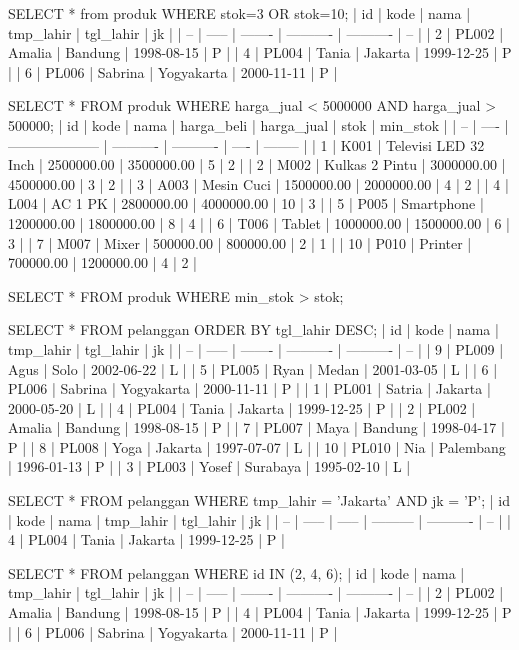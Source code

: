 SELECT * from produk WHERE stok=3 OR stok=10;
| id | kode  | nama    | tmp_lahir  | tgl_lahir  | jk |
| -- | ----- | ------- | ---------- | ---------- | -- |
| 2  | PL002 | Amalia  | Bandung    | 1998-08-15 | P  |
| 4  | PL004 | Tania   | Jakarta    | 1999-12-25 | P  |
| 6  | PL006 | Sabrina | Yogyakarta | 2000-11-11 | P  |

SELECT * FROM produk WHERE harga_jual < 5000000 AND harga_jual > 500000;
| id | kode | nama                 | harga_beli | harga_jual | stok | min_stok |
| -- | ---- | -------------------- | ---------- | ---------- | ---- | -------- |
| 1  | K001 | Televisi LED 32 Inch | 2500000.00 | 3500000.00 | 5    | 2        |
| 2  | M002 | Kulkas 2 Pintu       | 3000000.00 | 4500000.00 | 3    | 2        |
| 3  | A003 | Mesin Cuci           | 1500000.00 | 2000000.00 | 4    | 2        |
| 4  | L004 | AC 1 PK              | 2800000.00 | 4000000.00 | 10   | 3        |
| 5  | P005 | Smartphone           | 1200000.00 | 1800000.00 | 8    | 4        |
| 6  | T006 | Tablet               | 1000000.00 | 1500000.00 | 6    | 3        |
| 7  | M007 | Mixer                | 500000.00  | 800000.00  | 2    | 1        |
| 10 | P010 | Printer              | 700000.00  | 1200000.00 | 4    | 2        |

SELECT * FROM produk WHERE min_stok > stok;

SELECT * FROM pelanggan ORDER BY tgl_lahir DESC;
| id | kode  | nama    | tmp_lahir  | tgl_lahir  | jk |
| -- | ----- | ------- | ---------- | ---------- | -- |
| 9  | PL009 | Agus    | Solo       | 2002-06-22 | L  |
| 5  | PL005 | Ryan    | Medan      | 2001-03-05 | L  |
| 6  | PL006 | Sabrina | Yogyakarta | 2000-11-11 | P  |
| 1  | PL001 | Satria  | Jakarta    | 2000-05-20 | L  |
| 4  | PL004 | Tania   | Jakarta    | 1999-12-25 | P  |
| 2  | PL002 | Amalia  | Bandung    | 1998-08-15 | P  |
| 7  | PL007 | Maya    | Bandung    | 1998-04-17 | P  |
| 8  | PL008 | Yoga    | Jakarta    | 1997-07-07 | L  |
| 10 | PL010 | Nia     | Palembang  | 1996-01-13 | P  |
| 3  | PL003 | Yosef   | Surabaya   | 1995-02-10 | L  |

SELECT * FROM pelanggan WHERE tmp_lahir = 'Jakarta' AND jk = 'P';
| id | kode  | nama  | tmp_lahir | tgl_lahir  | jk |
| -- | ----- | ----- | --------- | ---------- | -- |
| 4  | PL004 | Tania | Jakarta   | 1999-12-25 | P  |

SELECT * FROM pelanggan WHERE id IN (2, 4, 6);
| id | kode  | nama    | tmp_lahir  | tgl_lahir  | jk |
| -- | ----- | ------- | ---------- | ---------- | -- |
| 2  | PL002 | Amalia  | Bandung    | 1998-08-15 | P  |
| 4  | PL004 | Tania   | Jakarta    | 1999-12-25 | P  |
| 6  | PL006 | Sabrina | Yogyakarta | 2000-11-11 | P  |
